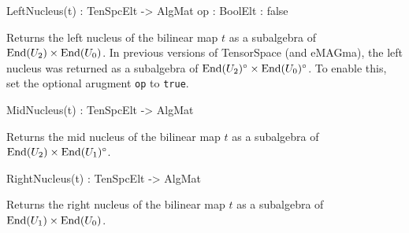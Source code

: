\documentclass{documentation}
\begin{document}
\begin{intrinsics}
LeftNucleus(t) : TenSpcElt -> AlgMat
    op : BoolElt : false
\end{intrinsics}

Returns the left nucleus of the bilinear map $t$ as a subalgebra of $\operatorname{End}(U_2)\times \operatorname{End}(U_0)$.
In previous versions of TensorSpace (and eMAGma), the left nucleus was returned as a subalgebra of $\operatorname{End}(U_2)^\circ\times \operatorname{End}(U_0)^\circ$.
To enable this, set the optional arugment \texttt{op} to \texttt{true}.

\begin{intrinsics}
MidNucleus(t) : TenSpcElt -> AlgMat
\end{intrinsics}

Returns the mid nucleus of the bilinear map $t$ as a subalgebra of $\operatorname{End}(U_2)\times \operatorname{End}(U_1)^\circ$.

\begin{intrinsics}
RightNucleus(t) : TenSpcElt -> AlgMat
\end{intrinsics}

Returns the right nucleus of the bilinear map $t$ as a subalgebra of $\operatorname{End}(U_1)\times \operatorname{End}(U_0)$.
\end{document}
